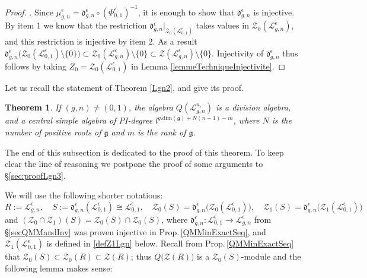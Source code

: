 \documentclass[11pt]{amsart}
\newtheorem{teo}{Theorem}[section]
\newcommand{\e}{\epsilon}
\newcommand{\Ll}{\mathcal{L}}
\begin{document}
\begin{proof}
. Since $\mu_{g,n}^\e = \mathfrak{d}_{g,n}^\e \circ (\Phi_{0,1}^\e)^{-1}$, it is enough to show that $\mathfrak{d}_{g,n}^\e$ is injective. By item 1 we know that the restriction $\mathfrak{d}_{g,n}^{\e}|_{\mathcal{Z}_0(\mathcal{L}^\e_{0,1})}$ takes values in $\mathcal{Z}_0(\mathcal{L}_{g,n}^\e)$, and this restriction is injective by item 2. As a result $\mathfrak{d}_{g,n}^{\e}\bigl( \mathcal{Z}_0(\mathcal{L}_{0,1}^\e) \setminus \{ 0 \} \bigr) \subset \mathcal{Z}_0(\mathcal{L}_{g,n}^\e) \setminus \{ 0 \} \subset \mathcal{Z}(\mathcal{L}_{g,n}^\e) \setminus \{ 0 \}$. Injectivity of $\mathfrak{d}_{g,n}^\e$ thus follows by taking $Z_0 = \mathcal{Z}_0(\mathcal{L}_{0,1}^\e)$ in Lemma \ref{lemmeTechniqueInjectivite}.
\end{proof}

Let us recall the statement of Theorem \ref{Lgn2}, and give its proof.
\begin{teo}\label{Lgnteo2} If $(g,n) \neq (0,1)$, the algebra $Q(\Ll_{g,n}^{u_\e})$ is a division algebra, and a central simple algebra of PI-degree $l^{g.\mathrm{dim}(\mathfrak{g})+N(n-1)-m}$, where $N$ is the number of positive roots of $\mathfrak{g}$ and $m$ is the rank of $\mathfrak{g}$.
\end{teo}
The end of this subsection is dedicated to the proof of this theorem. To keep clear the line of reasoning we postpone the proof of some arguments to \S \ref{sec:proofLgn3}.

We will use the following shorter notations:
\[ R := \mathcal{L}_{g,n}^{\e}, \quad S := \mathfrak{d}_{g,n}^{\e}(\mathcal{L}_{0,1}^\e) \cong \mathcal{L}_{0,1}^\e, \quad \mathcal{Z}_0(S) = \mathfrak{d}_{g,n}^{\e}\bigl( \mathcal{Z}_0(\mathcal{L}_{0,1}^\e) \bigr), \quad \mathcal{Z}_1(S) = \mathfrak{d}^{\e}_{g,n}\bigl( \mathcal{Z}_1(\mathcal{L}_{0,1}^\e) \bigr) \]
and $(\mathcal{Z}_0\cap \mathcal{Z}_1)(S) = \mathcal{Z}_0(S)\cap \mathcal{Z}_0(S)$, where $\mathfrak{d}_{g,n}^{\e} : \mathcal{L}_{0,1}^\e \to \mathcal{L}_{g,n}^{\e}$ from \S\ref{secQMMandInv} was proven injective in Prop.\,\ref{QMMinExactSeq}, and $\mathcal{Z}_1(\mathcal{L}_{0,1}^\e)$ is defined in \eqref{defZ1Lgn} below. Recall from Prop.\,\ref{QMMinExactSeq} that $\mathcal{Z}_0(S) \subset \mathcal{Z}_0(R) \subset \mathcal{Z}(R)$; thus $Q\bigl( \mathcal{Z}(R) \bigr)$ is a $\mathcal{Z}_0(S)$-module and the following lemma makes sense:
\end{document}
